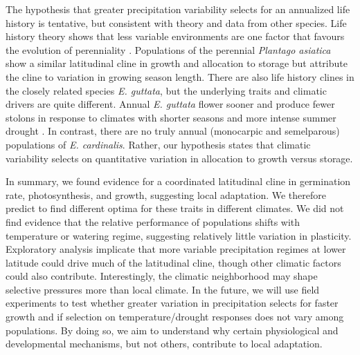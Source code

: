 \documentclass[11pt, oneside]{article}
\begin{document}
The hypothesis that greater precipitation variability selects for an annualized life history is tentative, but consistent with theory and data from other species. Life history theory shows that less variable environments are one factor that favours the evolution of perenniality \citep{Stearns_1976, Iwasa_Cohen_1989, Friedman_Rubin_2015}. Populations of the perennial \textit{Plantago asiatica} show a similar latitudinal cline in growth and allocation to storage \citep{Sawada_etal_1994} but attribute the cline to variation in growing season length. There are also life history clines in the closely related species \textit{E. guttata}, but the underlying traits and climatic drivers are quite different. Annual \textit{E. guttata} flower sooner and produce fewer stolons in response to climates with shorter seasons and more intense summer drought \citep{Lowry_Willis_2010, Friedman_etal_2015, Kooyers_etal_2015}. In contrast, there are no truly annual (monocarpic and semelparous) populations of \textit{E. cardinalis}. Rather, our hypothesis states that climatic variability selects on quantitative variation in allocation to growth versus storage. 


In summary, we found evidence for a coordinated latitudinal cline in germination rate, photosynthesis, and growth, suggesting local adaptation. We therefore predict to find different optima for these traits in different climates. We did not find evidence that the relative performance of populations shifts with temperature or watering regime, suggesting relatively little variation in plasticity. Exploratory analysis implicate that more variable precipitation regimes at lower latitude could drive much of the latitudinal cline, though other climatic factors could also contribute. Interestingly, the climatic neighborhood may shape selective pressures more than local climate. In the future, we will use field experiments to test whether greater variation in precipitation selects for faster growth and if selection on temperature/drought responses does not vary among populations. By doing so, we aim to understand why certain physiological and developmental mechanisms, but not others, contribute to local adaptation.
\end{document}
